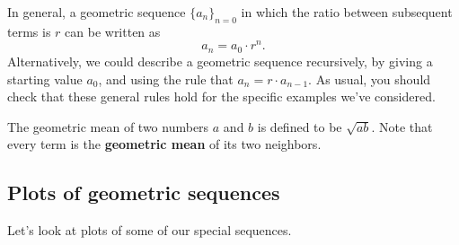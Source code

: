 \documentclass{ximera}
\begin{document}
In general, a geometric sequence $\{a_n\}_{n=0}$ in which the ratio between
subsequent terms is $r$ can be written as
\[
a_n = a_0 \cdot r^{n}.
\]
Alternatively, we could describe a geometric sequence
recursively, by giving a starting value $a_0$, and using the rule that
$a_{n} = r \cdot a_{n-1}$.  As usual, you should check that these general 
rules hold for the specific examples we've considered.

\begin{remark}
The geometric mean of two numbers $a$ and $b$ is defined to be
$\sqrt{ab}$. Note that every term is the \textbf{geometric mean} of its two neighbors.   

\end{remark}
%


\subsection{Plots of geometric sequences}

Let's look at plots of some of our special sequences.   
\end{document}
